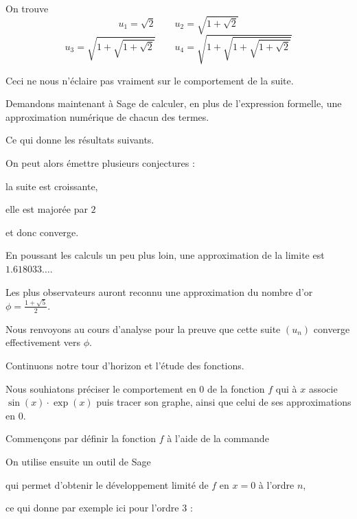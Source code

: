 \change

\change

On trouve 
$$u_1 = \sqrt{2} \qquad u_2 = \sqrt{1+\sqrt{2}}
$$
$$ u_3 = \sqrt{1+\sqrt{1+\sqrt{2}}} \qquad 
u_4 = \sqrt{1+\sqrt{1+\sqrt{1+\sqrt{2}}}}$$

Ceci ne nous n'éclaire pas vraiment sur le comportement de la suite.

\change
Demandons maintenant à Sage de calculer, en plus de l'expression formelle, une approximation numérique de chacun des termes.

Ce qui donne les résultats suivants.

\change

\change

\change

\change

On peut alors émettre plusieurs conjectures : 

la suite est croissante, 

elle est majorée par $2$ 

et donc converge. 


\change

En poussant les calculs un peu plus loin, une approximation de la limite est
$1.618033\ldots$. 

\change
Les plus observateurs auront reconnu une approximation 
du nombre d'or $\phi = \frac{1+\sqrt{5}}{2}$. 

Nous renvoyons au cours d'analyse pour la preuve que 
cette suite $(u_n)$ converge effectivement vers $\phi$.


\diapo

Continuons notre tour d'horizon et l'étude des fonctions. 

Nous souhiatons préciser le comportement en $0$ de la fonction 
$f$ qui à $x$ associe $\sin(x) \cdot \exp(x)$ puis tracer son graphe, 
ainsi que celui de ses approximations en $0$.

\change
Commençons par définir la fonction $f$ à l'aide de 
la commande 



\change
On utilise ensuite un outil de Sage


qui permet d'obtenir le développement limité de  $f$ en $x=0$ à l'ordre $n$, 

\change
ce qui donne par exemple ici pour l'ordre $3$ :

